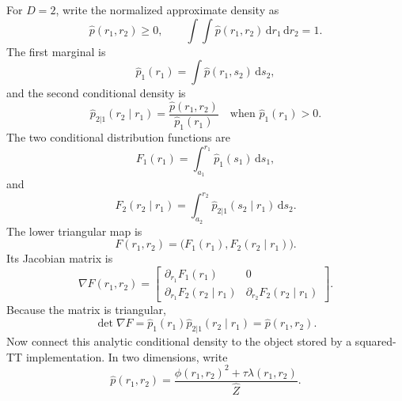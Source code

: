 \documentclass[11pt]{article}
\numberwithin{equation}{section}
\newcommand{\dd}{\,\mathrm d}
\begin{document}
For \(D=2\), write the normalized approximate density as
\begin{equation}
    \widehat p(r_1,r_2)\ge0,
    \qquad
    \int\!\!\int \widehat p(r_1,r_2)\dd r_1\dd r_2=1.
    \label{eq:p24-p23-kr2-1}
\end{equation}
The first marginal is
\begin{equation}
    \widehat p_1(r_1)
    =
    \int \widehat p(r_1,s_2)\dd s_2,
    \label{eq:p24-p23-kr2-2}
\end{equation}
and the second conditional density is
\begin{equation}
    \widehat p_{2|1}(r_2\mid r_1)
    =
    \frac{\widehat p(r_1,r_2)}{\widehat p_1(r_1)}
    \quad\text{when }\widehat p_1(r_1)>0.
    \label{eq:p24-p23-kr2-3}
\end{equation}
The two conditional distribution functions are
\begin{equation}
    F_1(r_1)
    =
    \int_{a_1}^{r_1}\widehat p_1(s_1)\dd s_1,
    \label{eq:p24-p23-kr2-4}
\end{equation}
and
\begin{equation}
    F_2(r_2\mid r_1)
    =
    \int_{a_2}^{r_2}
    \widehat p_{2|1}(s_2\mid r_1)\dd s_2.
    \label{eq:p24-p23-kr2-5}
\end{equation}
The lower triangular map is
\begin{equation}
    F(r_1,r_2)=
    \bigl(F_1(r_1),F_2(r_2\mid r_1)\bigr).
    \label{eq:p24-p23-kr2-6}
\end{equation}
Its Jacobian matrix is
\begin{equation}
    \nabla F(r_1,r_2)
    =
    \begin{bmatrix}
    \partial_{r_1}F_1(r_1) & 0\\
    \partial_{r_1}F_2(r_2\mid r_1) &
    \partial_{r_2}F_2(r_2\mid r_1)
    \end{bmatrix}.
    \label{eq:p24-p23-kr2-7}
\end{equation}
Because the matrix is triangular,
\begin{equation}
    \det\nabla F
    =
    \widehat p_1(r_1)\widehat p_{2|1}(r_2\mid r_1)
    =
    \widehat p(r_1,r_2).
    \label{eq:p24-p23-kr2-8}
\end{equation}
Now connect this analytic conditional density to the object stored by a
squared-TT implementation.  In two dimensions, write
\begin{equation}
    \widehat p(r_1,r_2)
    =
    \frac{\phi(r_1,r_2)^2+\tau\lambda(r_1,r_2)}
    {\widehat Z}.
    \label{eq:p24-p23-kr2-8a}
\end{equation}
\end{document}
